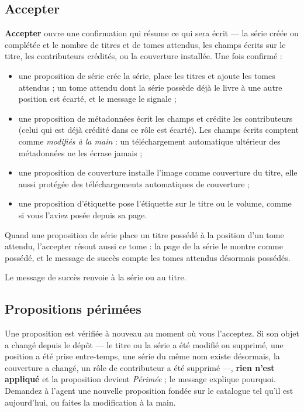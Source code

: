 \subsection{Accepter}

\textbf{Accepter} ouvre une confirmation qui résume ce qui sera
écrit --- la série créée ou complétée et le nombre de titres et de
tomes attendus, les champs écrits sur le titre, les contributeurs
crédités, ou la couverture installée. Une fois confirmé :

\begin{itemize}
  \item une proposition de série crée la série, place les titres et
        ajoute les tomes attendus ; un tome attendu dont la série
        possède déjà le livre à une autre position est écarté, et le
        message le signale ;
  \item une proposition de métadonnées écrit les champs et crédite
        les contributeurs (celui qui est déjà crédité dans ce rôle est
        écarté). Les champs écrits comptent comme \emph{modifiés à la
        main} : un téléchargement automatique ultérieur des
        métadonnées ne les écrase jamais ;
  \item une proposition de couverture installe l'image comme
        couverture du titre, elle aussi protégée des téléchargements
        automatiques de couverture ;
  \item une proposition d'étiquette pose l'étiquette sur le titre ou le
        volume, comme si vous l'aviez posée depuis sa page.
\end{itemize}

Quand une proposition de série place un titre possédé à la position
d'un tome attendu, l'accepter résout aussi ce tome : la page de la série
le montre comme possédé, et le message de succès compte les tomes
attendus désormais possédés.

Le message de succès renvoie à la série ou au titre.

\subsection{Propositions périmées}

Une proposition est vérifiée à nouveau au moment où vous l'acceptez.
Si son objet a changé depuis le dépôt --- le titre ou la série a été
modifié ou supprimé, une position a été prise entre-temps, une série
du même nom existe désormais, la couverture a changé, un rôle de
contributeur a été supprimé ---,
\textbf{rien n'est appliqué} et la proposition devient
\emph{Périmée} ; le message explique pourquoi. Demandez à l'agent une
nouvelle proposition fondée sur le catalogue tel qu'il est
aujourd'hui, ou faites la modification à la main.


